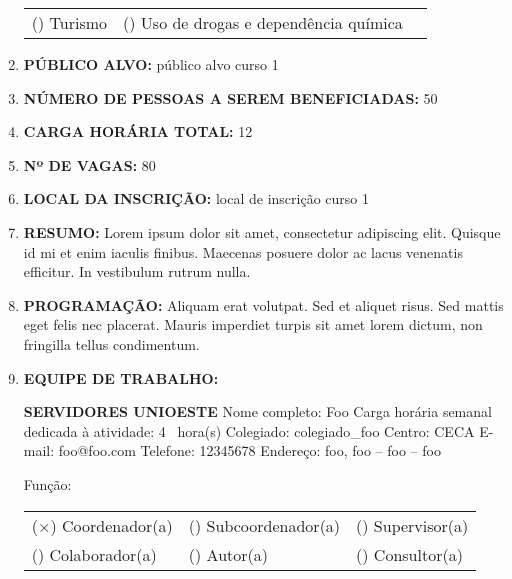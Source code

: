 \documentclass[12pt,a4paper,oneside]{article}%
\begin{document}
\begin{enumerate}
{\begin{tabularx}{\linewidth}{X|X|X}
(\phantom{$\times$}) Turismo &(\phantom{$\times$}) Uso de drogas e dependência química &\\%
\end{tabularx}%
}%
\item%
\textbf{PÚBLICO ALVO: }%
público alvo curso 1%
\item%
\textbf{NÚMERO DE PESSOAS A SEREM BENEFICIADAS: }%
50%
\item%
\textbf{CARGA HORÁRIA TOTAL: }%
12%
\item%
\textbf{Nº DE VAGAS: }%
80%
\item%
\textbf{LOCAL DA INSCRIÇÃO: }%
local de inscrição curso 1%
\item%
\textbf{RESUMO: }%
\newline%
Lorem ipsum dolor sit amet, consectetur adipiscing elit. Quisque id mi et enim iaculis finibus. Maecenas posuere dolor ac lacus venenatis efficitur. In vestibulum rutrum nulla.%
\item%
\textbf{PROGRAMAÇÃO: }%
\newline%
Aliquam erat volutpat. Sed et aliquet risus. Sed mattis eget felis nec placerat. Mauris imperdiet turpis sit amet lorem dictum, non fringilla tellus condimentum.%
\item%
\textbf{EQUIPE DE TRABALHO: }%
\newline%
\begin{mdframed}[innertopmargin=5pt, innerleftmargin=3pt, innerrightmargin=3pt]%
\textbf{SERVIDORES UNIOESTE }%
\newline%
Nome completo: %
Foo%
\newline%
Carga horária semanal dedicada à atividade: %
4%
\ hora(s) \hfill%
\newline%
Colegiado: %
colegiado\_foo%
\newline%
Centro: %
CECA%
\newline%
E-mail: %
foo@foo.com%
\newline%
Telefone: %
12345678%
\newline%
Endereço: %
foo, foo -- foo -- foo%
\newline%
\begin{mdframed}[innertopmargin=5pt, innerleftmargin=3pt, innerrightmargin=3pt]%
Função: %
\newline%
\begin{tabularx}{\linewidth}{XXX}%
($\times$) Coordenador(a)&(\phantom{$\times$}) Subcoordenador(a) &(\phantom{$\times$}) Supervisor(a) \\%
(\phantom{$\times$}) Colaborador(a) &(\phantom{$\times$}) Autor(a) &(\phantom{$\times$}) Consultor(a) \\%

\end{tabularx}
\end{mdframed}
\end{mdframed}
\end{enumerate}
\end{document}
